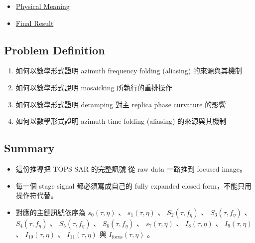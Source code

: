 \documentclass[11pt]{article}
\providecommand{\tightlist}{%
  \setlength{\itemsep}{0pt}\setlength{\parskip}{0pt}}
\begin{document}
\begin{itemize}
\begin{itemize}
    \begin{itemize}
    \tightlist
    \item
      \protect\hyperlink{51-azimuth-time-folding-explain}{5.1. Azimuth
      Time Folding (Explain)}
    \item
      \protect\hyperlink{52-mosaicking}{5.2. Mosaicking}
    \item
      \protect\hyperlink{53-deramping}{5.3. Deramping}
    \item
      \protect\hyperlink{54-low-pass-filter}{5.4. Low Pass Filter}
    \item
      \protect\hyperlink{55-reramping}{5.5. Reramping}
    \end{itemize}
  \item
    \protect\hyperlink{6-focused-image}{6. Focused Image}
  \end{itemize}
\item
  \protect\hyperlink{physical-meaning}{Physical Meaning}
\item
  \protect\hyperlink{final-result}{Final Result}
\end{itemize}

\hypertarget{problem-definition}{%
\subsection{Problem Definition}\label{problem-definition}}

\begin{enumerate}
\def\labelenumi{\arabic{enumi}.}
\tightlist
\item
  如何以數學形式證明 azimuth frequency folding (aliasing) 的來源與其機制
\item
  如何以數學形式說明 mosaicking 所執行的重排操作
\item
  如何以數學形式證明 deramping 對主 replica phase curvature 的影響
\item
  如何以數學形式證明 azimuth time folding (aliasing) 的來源與其機制
\end{enumerate}

\hypertarget{summary}{%
\subsection{Summary}\label{summary}}

\begin{itemize}
\tightlist
\item
  這份推導把 TOPS SAR 的完整訊號 從 raw data 一路推到 focused image。
\item
  每一個 stage signal 都必須寫成自己的 fully expanded closed
  form，不能只用操作符代替。
\item
  對應的主鏈訊號依序為 \(s_0(\tau,\eta)\) 、 \(s_1(\tau,\eta)\) 、
  \(S_2(\tau,f_\eta)\) 、 \(S_3(\tau,f_\eta)\) 、 \(S_4(\tau,f_\eta)\)
  、 \(S_5(\tau,f_\eta)\) 、 \(S_6(\tau,f_\eta)\) 、 \(s_7(\tau,\eta)\)
  、 \(I_8(\tau,\eta)\) 、 \(I_9(\tau,\eta)\) 、 \(I_{10}(\tau,\eta)\)
  、 \(I_{11}(\tau,\eta)\) 與 \(I_{\mathrm{focus}}(\tau,\eta)\) 。
\end{itemize}
\end{document}
